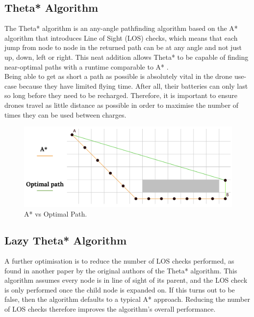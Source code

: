 \documentclass[a4paper,11pt,titlepage]{report}
\begin{document}
\subsection{Theta* Algorithm}
The Theta* algorithm is an any-angle pathfinding algorithm based on the A* algorithm that introduces Line of Sight (LOS) checks, which means that each jump from node to node in the returned path can be at any angle and not just up, down, left or right. This neat addition allows Theta* to be capable of finding near-optimal paths with a runtime comparable to A* \cite{Uras2015}.\\

Being able to get as short a path as possible is absolutely vital in the drone use-case because they have limited flying time. After all, their batteries can only last so long before they need to be recharged. Therefore, it is important to ensure drones travel as little distance as possible in order to maximise the number of times they can be used between charges.

\begin{figure}[!hbpt]
  \center
  \includegraphics[width=\linewidth]{img/a_star_vs_optimal.png}
  \caption{A* vs Optimal Path. \cite{Balaji2017}}
  \label{fig:a_star_vs_optimal}
\end{figure}

\clearpage
\subsection{Lazy Theta* Algorithm}
A further optimisation is to reduce the number of LOS checks performed, as found in another paper by the original authors of the Theta* algorithm\cite{Nash2010}. This algorithm assumes every node is in line of sight of its parent, and the LOS check is only performed once the child node is expanded on. If this turns out to be false, then the algorithm defaults to a typical A* approach. Reducing the number of LOS checks therefore improves the algorithm's overall performance.
\end{document}
